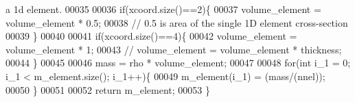 \begin{DoxyCode}
{       a 1d element.}
00035 
00036     \textcolor{keywordflow}{if}(xcoord.size()==2)\{
00037       volume\_element = volume\_element * 0.5;
00038       \textcolor{comment}{// 0.5 is area of the single 1D element cross-section}
00039     \}
00040 
00041     \textcolor{keywordflow}{if}(xcoord.size()==4)\{
00042       volume\_element = volume\_element * 1;
00043       \textcolor{comment}{// volume\_element = volume\_element * thickness;}
00044     \}
00045 
00046     mass = rho * volume\_element;
00047 
00048     \textcolor{keywordflow}{for}(\textcolor{keywordtype}{int} i\_1 = 0; i\_1 < m\_element.size(); i\_1++)\{
00049       m\_element(i\_1) = (mass/(nnel));
00050     \}
00051 
00052   \textcolor{keywordflow}{return} m\_element;
00053 \}
\end{DoxyCode}
